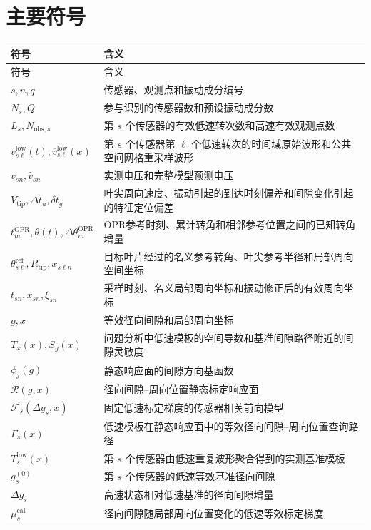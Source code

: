 \documentclass[UTF8,12pt,a4paper]{ctexart}
\newcommand{\Rcal}{\mathcal{R}}
\newcommand{\Fsen}{\mathcal{F}}
\begin{document}
\section*{主要符号}

\begin{longtable}{>{\centering\arraybackslash}p{}p{}}
\toprule
符号 & 含义\\
\midrule
\endfirsthead
\toprule
符号 & 含义\\
\midrule
\endhead
$s,n,q$ & 传感器、观测点和振动成分编号\\
$N_s,Q$ & 参与识别的传感器数和预设振动成分数\\
$L_s,N_{\mathrm{obs},s}$ & 第 $s$ 个传感器的有效低速转次数和高速有效观测点数\\
$v_{s\ell}^{\mathrm{low}}(t),\overline v_{s\ell}^{\mathrm{low}}(x)$ & 第 $s$ 个传感器第 $\ell$ 个低速转次的时间域原始波形和公共空间网格重采样波形\\
$v_{sn},\widehat v_{sn}$ & 实测电压和完整模型预测电压\\
$V_{\mathrm{tip}},\Delta t_u,\delta t_g$ & 叶尖周向速度、振动引起的到达时刻偏差和间隙变化引起的特征定位偏差\\
$t_m^{\mathrm{OPR}},\theta(t),\Delta\theta_m^{\mathrm{OPR}}$ & OPR参考时刻、累计转角和相邻参考位置之间的已知转角增量\\
$\theta_{s\ell}^{\mathrm{ref}},R_{\mathrm{tip}},x_{s\ell n}$ & 目标叶片经过的名义参考转角、叶尖参考半径和局部周向空间坐标\\
$t_{sn},x_{sn},\xi_{sn}$ & 采样时刻、名义局部周向坐标和振动修正后的有效周向坐标\\
$g,x$ & 等效径向间隙和局部周向坐标\\
$T_x(x),S_g(x)$ & 问题分析中低速模板的空间导数和基准间隙路径附近的间隙灵敏度\\
$\phi_j(g)$ & 静态响应面的间隙方向基函数\\
$\Rcal(g,x)$ & 径向间隙--周向位置静态标定响应面\\
$\Fsen_s(\Delta g_s,x)$ & 固定低速标定梯度的传感器相关前向模型\\
$\Gamma_s(x)$ & 低速模板在静态响应面中的等效径向间隙--周向位置查询路径\\
$T_s^{\mathrm{low}}(x)$ & 第 $s$ 个传感器由低速重复波形聚合得到的实测基准模板\\
$g_s^{(0)}$ & 第 $s$ 个传感器的低速等效基准径向间隙\\
$\Delta g_s$ & 高速状态相对低速基准的径向间隙增量\\
$\mu_s^{\mathrm{cal}}$ & 径向间隙随局部周向位置变化的低速等效标定梯度\\

\end{longtable}
\end{document}
